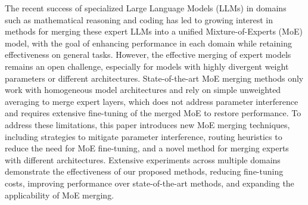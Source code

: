 

The recent success of specialized Large Language Models (LLMs) in domains such as mathematical reasoning and coding has led to growing interest in methods for merging these expert LLMs into a unified Mixture-of-Experts (MoE) model, with the goal of enhancing performance in each domain while retaining effectiveness on general tasks. 
However, the effective merging of expert models remains an open challenge, especially for models with highly divergent weight parameters or different architectures. 
State-of-the-art MoE merging methods only work with homogeneous model architectures and rely on simple unweighted averaging to merge expert layers, which does not address parameter interference and requires extensive fine-tuning of the merged MoE to restore performance. 
To address these limitations, this paper introduces new MoE merging techniques, including strategies to mitigate parameter interference, routing heuristics to reduce the need for MoE fine-tuning, and a novel method for merging experts with different architectures. Extensive experiments across multiple domains demonstrate the effectiveness of our proposed methods, reducing fine-tuning costs, improving performance over state-of-the-art methods, and expanding the applicability of MoE merging.

